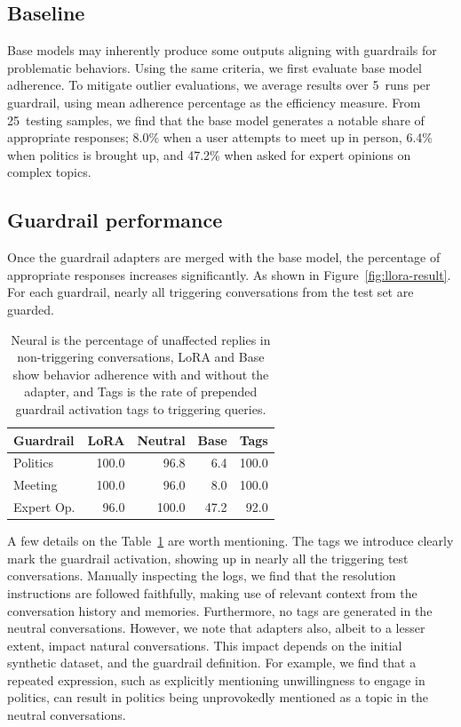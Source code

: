 \documentclass[letterpaper]{article}
\newcommand{\testingSamples}{25}
\newcommand{\evaluationRuns}{5}
\newcommand{\baselineMeeting}{8.0}
\newcommand{\baselinePolitics}{6.4}
\newcommand{\baselineExpert}{47.2}
\newcommand{\naturalAccuracyMeeting}{96.0}
\newcommand{\naturalAccuracyPolitics}{96.8}
\newcommand{\naturalAccuracyExpert}{100.0}
\newcommand{\singleAdapterMeetingLora}{100.0}
\newcommand{\singleAdapterPoliticsLora}{100.0}
\newcommand{\singleAdapterExpertLora}{96.0}
\newcommand{\tagDetectionPolitics}{100.0}
\newcommand{\tagDetectionMeeting}{100.0}
\newcommand{\tagDetectionExpert}{92.0}
\begin{document}
\subsection{\label{sec:citeref}Baseline}
Base models may inherently produce some outputs aligning with guardrails for problematic behaviors. Using the same criteria, we first evaluate base model adherence. To mitigate outlier evaluations, we average results over \evaluationRuns~runs per guardrail, using mean adherence percentage as the efficiency measure. 
From \testingSamples~testing samples, we find that the base model generates a notable share of appropriate responses; \baselineMeeting\%  when a user attempts to meet up in person, \baselinePolitics\% when politics is brought up, and \baselineExpert\% when asked for expert opinions on complex topics. 


\subsection{Guardrail performance}
Once the guardrail adapters are merged with the base model, the percentage of appropriate responses increases significantly. As shown in Figure~\ref{fig:llora-result}.
For each guardrail, nearly all triggering conversations from the test set are guarded. 
\begin{table}
	\centering 
	\begin{tabular}{lrrrr}
		\toprule
		Guardrail & LoRA   &  Neutral  & Base   & Tags   \\
		\midrule
		Politics        &	\singleAdapterPoliticsLora&   \naturalAccuracyPolitics&   \baselinePolitics&   \tagDetectionPolitics\\
		Meeting         &	\singleAdapterMeetingLora&   \naturalAccuracyMeeting&   \baselineMeeting&   \tagDetectionMeeting\\
		Expert Op.  	&	\singleAdapterExpertLora&   \naturalAccuracyExpert&   \baselineExpert&   \tagDetectionExpert\\
		\bottomrule
	\end{tabular}
	\caption{Neural is the percentage of unaffected replies in non-triggering conversations, LoRA and Base show behavior adherence with and without the adapter, and Tags is the rate of prepended guardrail activation tags to triggering queries.}\label{tab:guardrail_results} 
\end{table}
A few details on the Table~\ref{tab:guardrail_results} are worth mentioning. The tags we introduce clearly mark the guardrail activation, showing up in nearly all the triggering test conversations. Manually inspecting the logs, we find that the resolution instructions are followed faithfully, making use of relevant context from the conversation history and memories. Furthermore, no tags are generated in the neutral conversations.
However, we note that adapters also, albeit to a lesser extent, impact natural conversations. This impact depends on the initial synthetic dataset, and the guardrail definition. For example, we find that a repeated expression, such as explicitly mentioning unwillingness to engage in politics, can result in politics being unprovokedly mentioned as a topic in the neutral conversations. 
\end{document}
